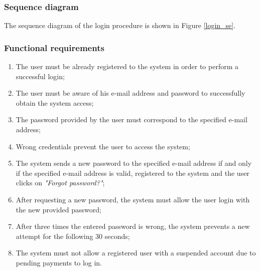 \subsubsection{Sequence diagram}
The sequence diagram of the login procedure is shown in Figure \ref{login_se}.

\subsubsection{Functional requirements}
\begin{enumerate}
\item The user must be already registered to the system in order to perform a successful login;
\item The user must be aware of his e-mail address and password to successfully obtain the system access;
\item The password provided by the user must correspond to the specified e-mail address;
\item Wrong credentials prevent the user to access the system;
\item The system sends a new password to the specified e-mail address if and only if the specified e-mail address is valid, registered to the system and the user clicks on \emph{"Forgot password?"};
\item After requesting a new password, the system must allow the user login with the new provided password;
\item After three times the entered password is wrong, the system prevents a new attempt for the following 30 seconds;
\item The system must not allow a registered user with a suspended account due to pending payments to log in.
\end{enumerate}

